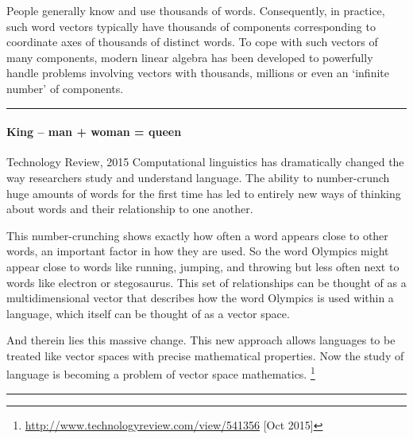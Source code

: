 \begin{example}
People generally know and use thousands of words.
Consequently, in practice, such word vectors typically have thousands of components corresponding to coordinate axes of thousands of distinct words.
To cope with such vectors of many components, modern linear algebra has been developed to powerfully handle problems involving vectors with thousands, millions or even an `infinite number' of components.
\end{example}

\begin{table}
\hrule
\begin{minipage}{\linewidth}
\paragraph{King -- man + woman = queen}
\begin{quoted}{Technology Review, 2015}
Computational linguistics has dramatically changed the way researchers study and understand language. 
The ability to number-crunch huge amounts of words for the first time has led to entirely new ways of thinking about words and their relationship to one another.

This number-crunching shows exactly how often a word appears close to other words, an important factor in how they are used. 
So the word Olympics might appear close to words like running, jumping, and throwing but less often next to words like electron or stegosaurus.  
This set of relationships can be thought of as a multidimensional vector that describes how the word Olympics is used within a language, which itself can be thought of as a vector space.  

And therein lies this massive change. 
This new approach allows languages to be treated like vector spaces with precise mathematical properties. 
Now the study of language is becoming a problem of vector space mathematics.
\footnote{\url{http://www.technologyreview.com/view/541356} [Oct 2015]}
\end{quoted}
\end{minipage}
\hrule
\end{table}




